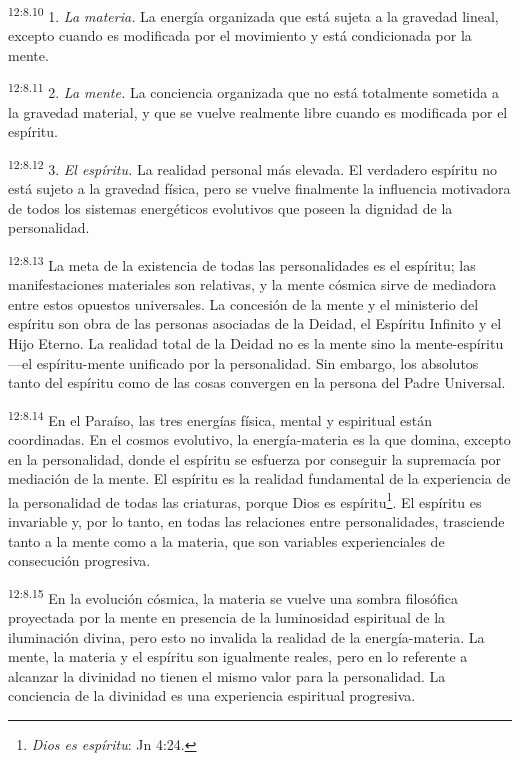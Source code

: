 \par
\textsuperscript{12:8.10} 1. \textit{La materia.} La energía organizada que está sujeta a la gravedad lineal, excepto cuando es modificada por el movimiento y está condicionada por la mente.

\par
\textsuperscript{12:8.11} 2. \textit{La mente.} La conciencia organizada que no está totalmente sometida a la gravedad material, y que se vuelve realmente libre cuando es modificada por el espíritu.

\par
\textsuperscript{12:8.12} 3. \textit{El espíritu.} La realidad personal más elevada. El verdadero espíritu no está sujeto a la gravedad física, pero se vuelve finalmente la influencia motivadora de todos los sistemas energéticos evolutivos que poseen la dignidad de la personalidad.

\par
\textsuperscript{12:8.13} La meta de la existencia de todas las personalidades es el espíritu; las manifestaciones materiales son relativas, y la mente cósmica sirve de mediadora entre estos opuestos universales. La concesión de la mente y el ministerio del espíritu son obra de las personas asociadas de la Deidad, el Espíritu Infinito y el Hijo Eterno. La realidad total de la Deidad no es la mente sino la mente-espíritu ---el espíritu-mente unificado por la personalidad. Sin embargo, los absolutos tanto del espíritu como de las cosas convergen en la persona del Padre Universal.

\par
\textsuperscript{12:8.14} En el Paraíso, las tres energías física, mental y espiritual están coordinadas. En el cosmos evolutivo, la energía-materia es la que domina, excepto en la personalidad, donde el espíritu se esfuerza por conseguir la supremacía por mediación de la mente. El espíritu es la realidad fundamental de la experiencia de la personalidad de todas las criaturas, porque Dios es espíritu\footnote{\textit{Dios es espíritu}: Jn 4:24.}. El espíritu es invariable y, por lo tanto, en todas las relaciones entre personalidades, trasciende tanto a la mente como a la materia, que son variables experienciales de consecución progresiva.

\par
\textsuperscript{12:8.15} En la evolución cósmica, la materia se vuelve una sombra filosófica proyectada por la mente en presencia de la luminosidad espiritual de la iluminación divina, pero esto no invalida la realidad de la energía-materia. La mente, la materia y el espíritu son igualmente reales, pero en lo referente a alcanzar la divinidad no tienen el mismo valor para la personalidad. La conciencia de la divinidad es una experiencia espiritual progresiva.

